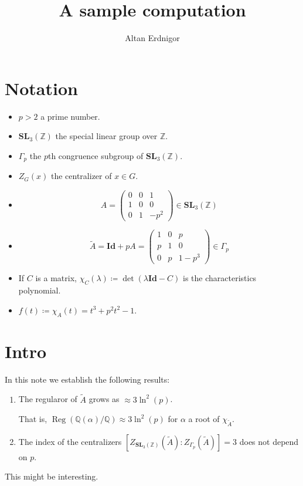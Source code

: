 \documentclass[a4paper]{article}
\DeclareMathOperator{\assign}{\coloneqq}        %
\newcommand{\Q}{\mathbb{Q}}        %
\newcommand{\Id}{\mathbf{Id}}        %
\newcommand{\SL}{\mathbf{SL}_3(\mathbb{Z})}        %
\newcommand{\SLp}{\Gamma_p}        %
\DeclareMathOperator{\Reg}{Reg}        %
\begin{document}
\title{A sample computation}	
\author{Altan Erdnigor}
\maketitle

\tableofcontents

\section{Notation}
\begin{itemize}
\item $p > 2$ a prime number.
\item $\SL$ the special linear group over $\mathbb{Z}$.
\item $\SLp$ the $p$th congruence subgroup of $\SL$.
\item $Z_G(x)$ the centralizer of $x \in G$.
\item 
\begin{equation}
\label{matrix_small}
A = 
\begin{pmatrix}
0 & 0 & 1 \\
1 & 0 & 0 \\
0 & 1 & -p^2
\end{pmatrix}
\in \SL
\end{equation}
\item 
\begin{equation}
\label{matrix_big}
\tilde A = \Id + p A =
\begin{pmatrix}
1 & 0 & p \\
p & 1 & 0 \\
0 & p & 1 - p^3
\end{pmatrix}
\in \SLp
\end{equation}

\item If $C$ is a matrix, $\chi_C(\lambda) \assign \det(\lambda \Id - C)$ is the characteristics polynomial.
\item $ f(t) \assign \chi_A(t) = t^3 + p^2 t^2 - 1$.

\end{itemize}

\section{Intro}
In this note we establish the following results:
\begin{enumerate}
\item
The regularor of $\tilde A$
grows as $\approx 3 \ln^2(p)$. 

That is, $\Reg ( \Q(\alpha)/\Q ) \approx 3 \ln^2(p) $ for $\alpha$ a root of $\chi_{\tilde A}$.

\item
The index of the centralizers
$ [Z_{\SL}(\tilde A) : Z_{\SLp}(\tilde A)] = 3$
does not depend on $p$.
\end{enumerate}
This might be interesting.
\end{document}

